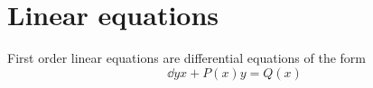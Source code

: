 \documentclass{book}
\begin{document}






\newpage
\section{Linear equations}

First order linear equations are differential equations of the form
\begin{dmath}
  \label{eq:linear}
  \dd{y}{x} + P(x) y = Q(x)
\end{dmath}
\end{document}
